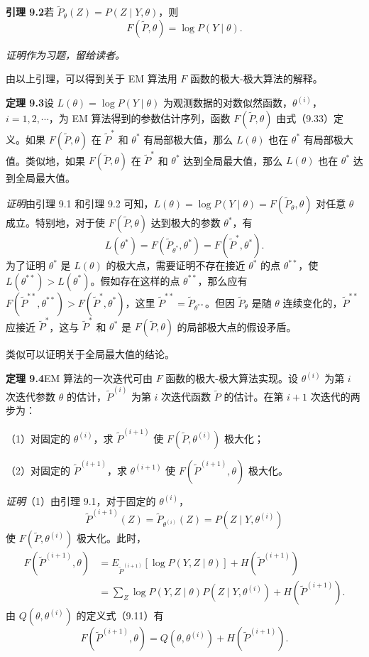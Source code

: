 \documentclass[UTF8, 12pt, fontset=fandol, oneside]{ctexart}
\begin{document}
\noindent\textbf{引理 9.2}\quad 若 $\tilde{P}_{\theta}(Z)=P(Z\mid Y,\theta)$，则
\begin{equation}
  F(\tilde{P},\theta)=\log P(Y\mid\theta).
  \tag{9.36}
\end{equation}

\noindent\textit{证明作为习题，留给读者。}

由以上引理，可以得到关于 EM 算法用 $F$ 函数的极大-极大算法的解释。

\noindent\textbf{定理 9.3}\quad 设 $L(\theta)=\log P(Y\mid\theta)$ 为观测数据的对数似然函数，$\theta^{(i)}$，$i=1,2,\cdots$，为 EM 算法得到的参数估计序列，函数 $F(\tilde{P},\theta)$ 由式（9.33）定义。如果 $F(\tilde{P},\theta)$ 在 $\tilde{P}^*$ 和 $\theta^*$ 有局部极大值，那么 $L(\theta)$ 也在 $\theta^*$ 有局部极大值。类似地，如果 $F(\tilde{P},\theta)$ 在 $\tilde{P}^*$ 和 $\theta^*$ 达到全局最大值，那么 $L(\theta)$ 也在 $\theta^*$ 达到全局最大值。

\noindent\textit{证明}\quad 由引理 9.1 和引理 9.2 可知，$L(\theta)=\log P(Y\mid\theta)=F(\tilde{P}_{\theta},\theta)$ 对任意 $\theta$ 成立。特别地，对于使 $F(\tilde{P},\theta)$ 达到极大的参数 $\theta^*$，有
\begin{equation}
  L(\theta^*)=F(\tilde{P}_{\theta^*},\theta^*)=F(\tilde{P}^*,\theta^*).
  \tag{9.37}
\end{equation}
为了证明 $\theta^*$ 是 $L(\theta)$ 的极大点，需要证明不存在接近 $\theta^*$ 的点 $\theta^{**}$，使 $L(\theta^{**})>L(\theta^*)$。假如存在这样的点 $\theta^{**}$，那么应有 $F(\tilde{P}^{**},\theta^{**})>F(\tilde{P}^*,\theta^*)$，这里 $\tilde{P}^{**}=\tilde{P}_{\theta^{**}}$。但因 $\tilde{P}_{\theta}$ 是随 $\theta$ 连续变化的，$\tilde{P}^{**}$ 应接近 $\tilde{P}^*$，这与 $\tilde{P}^*$ 和 $\theta^*$ 是 $F(\tilde{P},\theta)$ 的局部极大点的假设矛盾。

类似可以证明关于全局最大值的结论。

\noindent\textbf{定理 9.4}\quad EM 算法的一次迭代可由 $F$ 函数的极大-极大算法实现。设 $\theta^{(i)}$ 为第 $i$ 次迭代参数 $\theta$ 的估计，$\tilde{P}^{(i)}$ 为第 $i$ 次迭代函数 $\tilde{P}$ 的估计。在第 $i+1$ 次迭代的两步为：

（1）对固定的 $\theta^{(i)}$，求 $\tilde{P}^{(i+1)}$ 使 $F(\tilde{P},\theta^{(i)})$ 极大化；

（2）对固定的 $\tilde{P}^{(i+1)}$，求 $\theta^{(i+1)}$ 使 $F(\tilde{P}^{(i+1)},\theta)$ 极大化。

\noindent\textit{证明}\quad （1）由引理 9.1，对于固定的 $\theta^{(i)}$，
\[
  \tilde{P}^{(i+1)}(Z)=\tilde{P}_{\theta^{(i)}}(Z)=P(Z\mid Y,\theta^{(i)})
\]
使 $F(\tilde{P},\theta^{(i)})$ 极大化。此时，
\[
\begin{aligned}
  F(\tilde{P}^{(i+1)},\theta)
  &=E_{\tilde{P}^{(i+1)}}[\log P(Y,Z\mid\theta)]+H(\tilde{P}^{(i+1)})\\
  &=\sum_Z \log P(Y,Z\mid\theta)P(Z\mid Y,\theta^{(i)})
  +H(\tilde{P}^{(i+1)}).
\end{aligned}
\]
由 $Q(\theta,\theta^{(i)})$ 的定义式（9.11）有
\[
  F(\tilde{P}^{(i+1)},\theta)=Q(\theta,\theta^{(i)})+H(\tilde{P}^{(i+1)}).
\]
\end{document}
